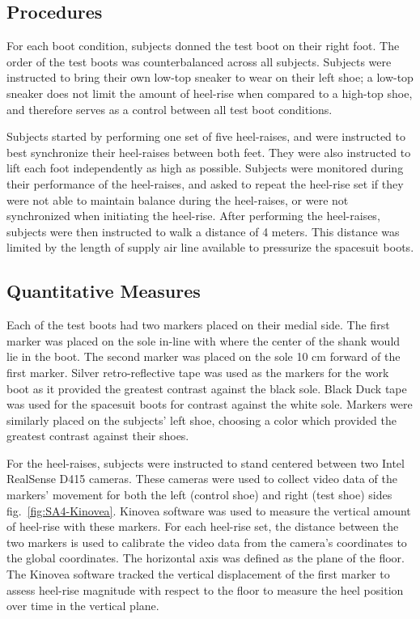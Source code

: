 \documentclass[defaultstyle,11pt]{comps}
\begin{document}
\hypertarget{procedures}{%
\subsection{Procedures}\label{procedures}}

For each boot condition, subjects donned the test boot on their right foot.
The order of the test boots was counterbalanced across all subjects.
Subjects were instructed to bring their own low-top sneaker to wear on their left shoe; a low-top sneaker does not limit the amount of heel-rise when compared to a high-top shoe, and therefore serves as a control between all test boot conditions.

Subjects started by performing one set of five heel-raises, and were instructed to best synchronize their heel-raises between both feet.
They were also instructed to lift each foot independently as high as possible.
Subjects were monitored during their performance of the heel-raises, and asked to repeat the heel-rise set if they were not able to maintain balance during the heel-raises, or were not synchronized when initiating the heel-rise.
After performing the heel-raises, subjects were then instructed to walk a distance of 4 meters.
This distance was limited by the length of supply air line available to pressurize the spacesuit boots.

\hypertarget{quantitative-measures}{%
\subsection{Quantitative Measures}\label{quantitative-measures}}

Each of the test boots had two markers placed on their medial side.
The first marker was placed on the sole in-line with where the center of the shank would lie in the boot.
The second marker was placed on the sole 10 cm forward of the first marker.
Silver retro-reflective tape was used as the markers for the work boot as it provided the greatest contrast against the black sole.
Black Duck tape was used for the spacesuit boots for contrast against the white sole.
Markers were similarly placed on the subjects' left shoe, choosing a color which provided the greatest contrast against their shoes.

For the heel-raises, subjects were instructed to stand centered between two Intel RealSense D415 cameras.
These cameras were used to collect video data of the markers' movement for both the left (control shoe) and right (test shoe) sides fig.~\ref{fig:SA4-Kinovea}.
Kinovea software was used to measure the vertical amount of heel-rise with these markers.
For each heel-rise set, the distance between the two markers is used to calibrate the video data from the camera's coordinates to the global coordinates.
The horizontal axis was defined as the plane of the floor.
The Kinovea software tracked the vertical displacement of the first marker to assess heel-rise magnitude with respect to the floor to measure the heel position over time in the vertical plane.
\end{document}
